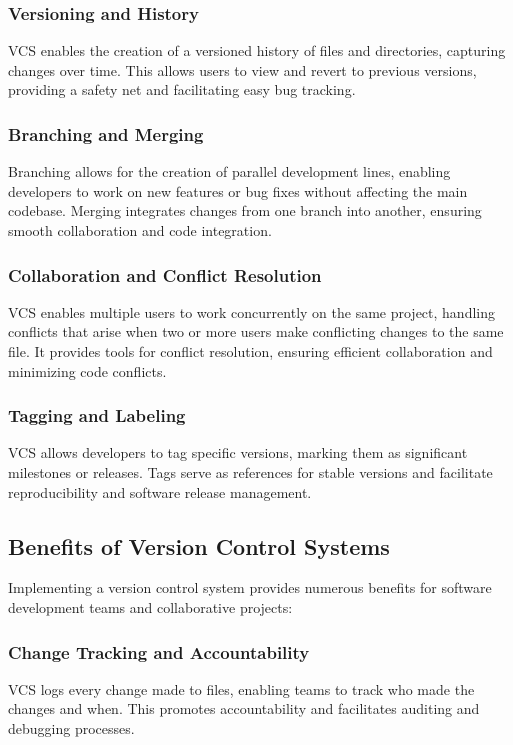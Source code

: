 \subsubsection*{Versioning and History}
VCS enables the creation of a versioned history of files and directories, capturing changes over time. This allows users to view and revert to previous versions, providing a safety net and facilitating easy bug tracking.

\subsubsection*{Branching and Merging}
Branching allows for the creation of parallel development lines, enabling developers to work on new features or bug fixes without affecting the main codebase. Merging integrates changes from one branch into another, ensuring smooth collaboration and code integration.

\subsubsection*{Collaboration and Conflict Resolution}
VCS enables multiple users to work concurrently on the same project, handling conflicts that arise when two or more users make conflicting changes to the same file. It provides tools for conflict resolution, ensuring efficient collaboration and minimizing code conflicts.

\subsubsection*{Tagging and Labeling}
VCS allows developers to tag specific versions, marking them as significant milestones or releases. Tags serve as references for stable versions and facilitate reproducibility and software release management.

\subsection*{Benefits of Version Control Systems}

Implementing a version control system provides numerous benefits for software development teams and collaborative projects:

\subsubsection*{Change Tracking and Accountability}
VCS logs every change made to files, enabling teams to track who made the changes and when. This promotes accountability and facilitates auditing and debugging processes.

